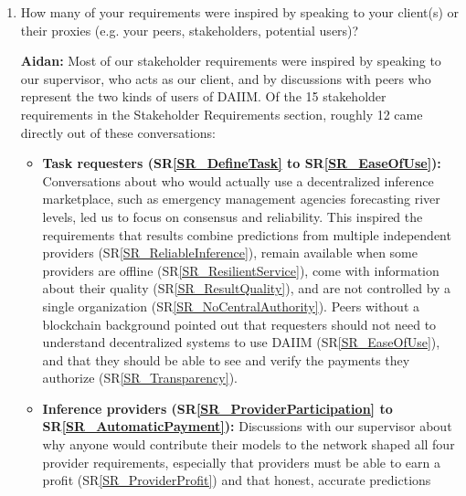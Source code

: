 \documentclass[12pt]{article}
\newcommand{\srref}[1]{SR\ref{#1}}
\begin{document}
\begin{enumerate}
Another pain point was leaving our team review call until the final two days before the deadline. The call lasted over three hours, making it difficult to coordinate everyone's availability and review the document efficiently. For future deliverables, we plan to create pull requests and have our sections ready for review three to four days before the deadline. This will allow team members to review each other's work at times that fit their schedules, provide feedback incrementally, and avoid relying on a single, lengthy meeting close to the deadline.

  \item How many of your requirements were inspired by speaking to your
  client(s) or their proxies (e.g. your peers, stakeholders, potential users)?

  \textbf{Aidan:} Most of our stakeholder requirements were inspired by
  speaking to our supervisor, who acts as our client, and by discussions with
  peers who represent the two kinds of users of DAIIM. Of the 15 stakeholder
  requirements in the Stakeholder Requirements section, roughly 12 came
  directly out of these conversations:
  \begin{itemize}
    \item \textbf{Task requesters (\srref{SR_DefineTask} to
    \srref{SR_EaseOfUse}):} Conversations about who would actually use a
    decentralized inference marketplace, such as emergency management agencies
    forecasting river levels, led us to focus on consensus and reliability.
    This inspired the requirements that results combine predictions from
    multiple independent providers (\srref{SR_ReliableInference}), remain
    available when some providers are offline (\srref{SR_ResilientService}),
    come with information about their quality (\srref{SR_ResultQuality}), and
    are not controlled by a single organization
    (\srref{SR_NoCentralAuthority}). Peers without a blockchain background
    pointed out that requesters should not need to understand decentralized
    systems to use DAIIM (\srref{SR_EaseOfUse}), and that they should be able
    to see and verify the payments they authorize (\srref{SR_Transparency}).
    \item \textbf{Inference providers (\srref{SR_ProviderParticipation} to
    \srref{SR_AutomaticPayment}):} Discussions with our supervisor about why
    anyone would contribute their models to the network shaped all four
    provider requirements, especially that providers must be able to earn a
    profit (\srref{SR_ProviderProfit}) and that honest, accurate predictions

\end{itemize}
\end{enumerate}
\end{document}
